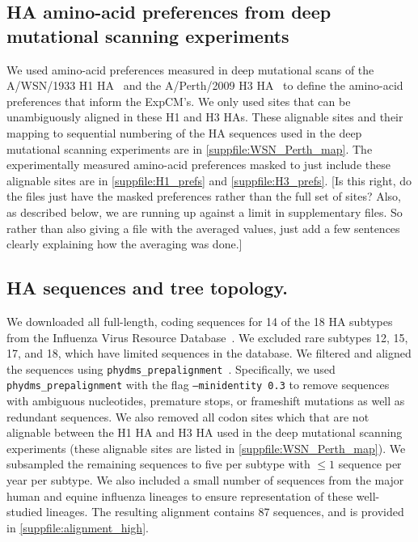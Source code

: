 \documentclass[11pt]{article}
\newcommand\jdbcomment[1]{{\color{red}[#1]}}
\begin{document}
\subsection*{HA amino-acid preferences from deep mutational scanning experiments}
We used amino-acid preferences measured in deep mutational scans of the A/WSN/1933 H1 HA~\citep{doud2016accurate} and the A/Perth/2009 H3 HA~\citep{lee2018deep} to define the amino-acid preferences that inform the ExpCM's. 
We only used sites that can be unambiguously aligned in these H1 and H3 HAs. 
These alignable sites and their mapping to sequential numbering of the HA sequences used in the deep mutational scanning experiments are in \ref{suppfile:WSN_Perth_map}. 
The experimentally measured amino-acid preferences masked to just include these alignable sites are in \ref{suppfile:H1_prefs} and \ref{suppfile:H3_prefs}.
\jdbcomment{Is this right, do the files just have the masked preferences rather than the full set of sites? Also, as described below, we are running up against a limit in supplementary files. So rather than also giving a file with the averaged values, just add a few sentences clearly explaining how the averaging was done.}

\subsection*{HA sequences and tree topology.}

We downloaded all full-length, coding sequences for 14 of the 18 HA subtypes from the Influenza Virus Resource Database~\citep[June 2017;][]{bao2008influenza}. 
We excluded rare subtypes 12, 15, 17, and 18, which have limited sequences in the database.  
We filtered and aligned the sequences using \texttt{phydms\_prepalignment}~\citep{hilton2017phydms}. 
Specifically, we used \texttt{phydms\_prepalignment} with the flag \texttt{--minidentity 0.3} to remove sequences with ambiguous nucleotides, premature stops, or frameshift mutations as well as redundant sequences.  
We also removed all codon sites which that are not alignable between the H1 HA and H3 HA used in the deep mutational scanning experiments (these alignable sites are listed in  \ref{suppfile:WSN_Perth_map}). 
We subsampled the remaining sequences to five per subtype with $\le 1$ sequence per year per subtype. 
We also included a small number of sequences from the major human and equine influenza lineages to ensure representation of these well-studied lineages. 
The resulting alignment contains 87 sequences, and is provided in \ref{suppfile:alignment_high}. 
\end{document}
